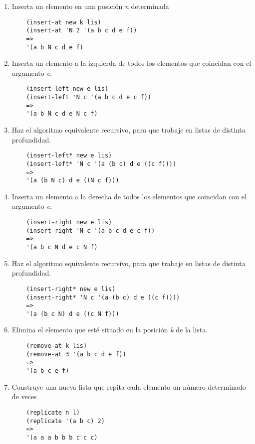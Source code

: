 \documentclass[11pt]{article}
\begin{document}
\begin{enumerate}
  \item Inserta un elemento en una posición \textit{n} determinada
\begin{verbatim}
    (insert-at new k lis)
    (insert-at 'N 2 '(a b c d e f))
    =>
    '(a b N c d e f)
\end{verbatim}

  \item Inserta un elemento a la izquierda de todos los elementos que coincidan con el argumento \textit{e}.
\begin{verbatim}
    (insert-left new e lis)
    (insert-left 'N c '(a b c d e c f))
    =>
    '(a b N c d e N c f)
\end{verbatim}

  \item Haz el algoritmo equivalente recursivo, para que trabaje en listas de distinta profundidad.
\begin{verbatim}
    (insert-left* new e lis)
    (insert-left* 'N c '(a (b c) d e ((c f))))
    =>
    '(a (b N c) d e ((N c f)))
\end{verbatim}

  \item Inserta un elemento a la derecha de todos los elementos que coincidan con el argumento \textit{e}.
\begin{verbatim}
    (insert-right new e lis)
    (insert-right 'N c '(a b c d e c f))
    =>
    '(a b c N d e c N f)
\end{verbatim}

  \item Haz el algoritmo equivalente recursivo, para que trabaje en listas de distinta profundidad.
\begin{verbatim}
    (insert-right* new e lis)
    (insert-right* 'N c '(a (b c) d e ((c f))))
    =>
    '(a (b c N) d e ((c N f)))
\end{verbatim}

  \item Elimina el elemento que esté situado en la posición \textit{k} de la lista.
\begin{verbatim}
    (remove-at k lis)
    (remove-at 3 '(a b c d e f))
    =>
    '(a b c e f)
\end{verbatim}

  \item Construye una nueva lista que repita cada elemento un número determinado de veces
\begin{verbatim}
    (replicate n l)
    (replicate '(a b c) 2)
    =>
    '(a a a b b b c c c)
\end{verbatim}


\end{enumerate}
\end{document}
